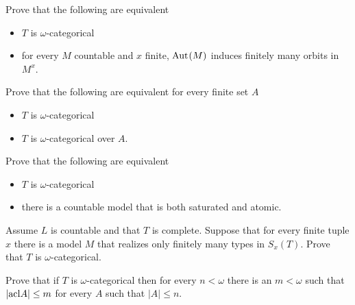 \begin{exercise}\label{ex_oligomorphic}
   Prove that the following are equivalent
   \begin{itemize}   
   \item[1.] $T$ is $\omega$-categorical
   \item[2.] for every $M$ countable and $x$ finite, ${\rm Aut\kern.15ex}(M)$ induces finitely many orbits in $M^x$.
   \end{itemize}
\end{exercise}

\begin{exercise}\label{ex_omega_cat_overA}
Prove that the following are equivalent for every finite set $A$
\begin{itemize}   
\item[1.] $T$ is $\omega$-categorical
\item[2.] $T$ is $\omega$-categorical over $A$.
\end{itemize}
\end{exercise}

\begin{exercise}\label{ex_omega_cat_sat=atomic}
Prove that the following are equivalent
\begin{itemize}   
\item[1.] $T$ is $\omega$-categorical
\item[2.] there is a countable model that is both saturated and atomic. 
\end{itemize}
\end{exercise}

\begin{exercise} 
Assume $L$ is countable and that $T$ is complete.
Suppose that for every finite tuple $x$ there is a model $M$ that realizes only finitely many types in $S_x(T)$.
Prove that $T$ is $\omega$-categorical.
\end{exercise}

\begin{exercise}
  Prove that if $T$ is $\omega$-categorical then for every $n<\omega$ there is an $m<\omega$ such that $|{\rm acl} A|\le m$ for every $A$ such that $|A|\le n$.
\end{exercise}


